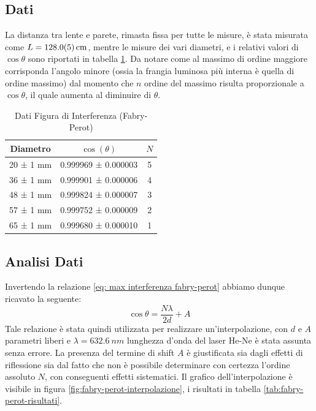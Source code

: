 \documentclass[a4paper]{article}
\begin{document}
\subsection{Dati}
La distanza tra lente e parete, rimasta fissa per tutte le misure, è stata misurata come $L=\SI{128 \pm 0.5}{\centi\meter}$, mentre le misure dei vari diametri, e i relativi valori di $\cos{\theta}$ sono riportati in tabella \ref{tab:fabry-perot-dati}. Da notare come al massimo di ordine maggiore corrisponda l'angolo minore (ossia la frangia luminosa più interna è quella di ordine massimo) dal momento che $n$ ordine del massimo risulta proporzionale a $\cos{\theta}$, il quale aumenta al diminuire di $\theta$.
\begin{table}[htbp]
\centering
\caption{Dati Figura di Interferenza (Fabry-Perot)}
\begin{tabular}{|c|c|c|}
\hline
Diametro & $\cos(\theta)$ & $N$ \\\hline\hline
20 ± 1 mm & 0.999969 ± 0.000003  & 5 \\
36 ± 1 mm & 0.999901 ± 0.000006  & 4 \\
48 ± 1 mm & 0.999824 ± 0.000007  & 3 \\
57 ± 1 mm & 0.999752 ± 0.000009  & 2 \\
65 ± 1 mm & 0.999680 ± 0.000010  & 1 \\
\hline
\end{tabular}
\label{tab:fabry-perot-dati}
\end{table}


\subsection{Analisi Dati}
Invertendo la relazione \ref{eq: max interferenza fabry-perot} abbiamo dunque ricavato la seguente:
\[\cos \theta = \frac{N\lambda}{2d} + A\]
Tale relazione è stata quindi utilizzata per realizzare un'interpolazione,
con $d$ e $A$ parametri liberi e $\lambda=\SI{632.6}{nm}$ lunghezza d'onda del laser He-Ne è stata assunta senza errore. La presenza del termine di shift $A$ è giustificata sia dagli effetti di riflessione sia dal fatto che non è possibile determinare con certezza l'ordine assoluto $N$, con conseguenti effetti sistematici.
Il grafico dell'interpolazione è visibile in figura \ref{fig:fabry-perot-interpolazione}, i risultati in tabella \ref{tab:fabry-perot-risultati}.
\end{document}
